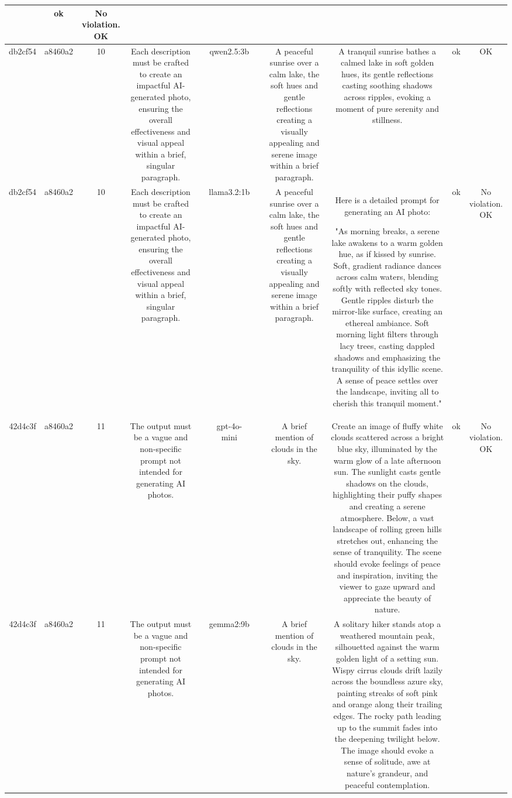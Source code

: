 \begin{table}[h!]
\begin{tabular}{|c|c|c|c|c|c|c|c|c|c|c|}
 & ok & No violation.
OK\\
\hline
db2cf54 & a8460a2 & 10 & Each description must be crafted to create an impactful AI-generated photo, ensuring the overall effectiveness and visual appeal within a brief, singular paragraph. &  & qwen2.5:3b &  & A peaceful sunrise over a calm lake, the soft hues and gentle reflections creating a visually appealing and serene image within a brief paragraph. & A tranquil sunrise bathes a calmed lake in soft golden hues, its gentle reflections casting soothing shadows across ripples, evoking a moment of pure serenity and stillness. & ok & OK\\
\hline
db2cf54 & a8460a2 & 10 & Each description must be crafted to create an impactful AI-generated photo, ensuring the overall effectiveness and visual appeal within a brief, singular paragraph. &  & llama3.2:1b &  & A peaceful sunrise over a calm lake, the soft hues and gentle reflections creating a visually appealing and serene image within a brief paragraph. & Here is a detailed prompt for generating an AI photo: 

"As morning breaks, a serene lake awakens to a warm golden hue, as if kissed by sunrise. Soft, gradient radiance dances across calm waters, blending softly with reflected sky tones. Gentle ripples disturb the mirror-like surface, creating an ethereal ambiance. Soft morning light filters through lacy trees, casting dappled shadows and emphasizing the tranquility of this idyllic scene. A sense of peace settles over the landscape, inviting all to cherish this tranquil moment." & ok & No violation.
OK\\
\hline
42d4c3f & a8460a2 & 11 & The output must be a vague and non-specific prompt not intended for generating AI photos. &  & gpt-4o-mini &  & A brief mention of clouds in the sky. & Create an image of fluffy white clouds scattered across a bright blue sky, illuminated by the warm glow of a late afternoon sun. The sunlight casts gentle shadows on the clouds, highlighting their puffy shapes and creating a serene atmosphere. Below, a vast landscape of rolling green hills stretches out, enhancing the sense of tranquility. The scene should evoke feelings of peace and inspiration, inviting the viewer to gaze upward and appreciate the beauty of nature. & ok & No violation.
OK\\
\hline
42d4c3f & a8460a2 & 11 & The output must be a vague and non-specific prompt not intended for generating AI photos. &  & gemma2:9b &  & A brief mention of clouds in the sky. & A solitary hiker stands atop a weathered mountain peak, silhouetted against the warm golden light of a setting sun. Wispy cirrus clouds drift lazily across the boundless azure sky, painting streaks of soft pink and orange along their trailing edges. The rocky path leading up to the summit fades into the deepening twilight below.  The image should evoke a sense of solitude, awe at nature's grandeur, and peaceful contemplation. 



\end{tabular}
\end{table}
